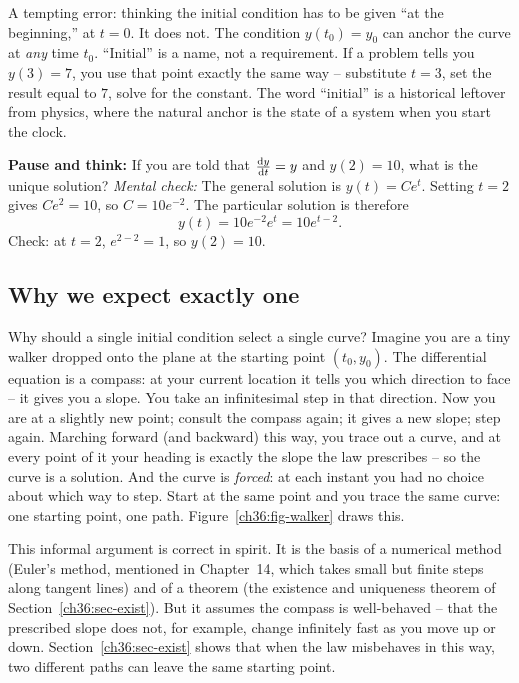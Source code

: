 \begin{trapbox}
A tempting error: thinking the initial condition has to be given ``at the beginning,'' at $t=0$. It does not. The condition $y(t_0)=y_0$ can anchor the curve at \emph{any} time $t_0$. ``Initial'' is a name, not a requirement. If a problem tells you $y(3) = 7$, you use that point exactly the same way -- substitute $t=3$, set the result equal to $7$, solve for the constant. The word ``initial'' is a historical leftover from physics, where the natural anchor is the state of a system when you start the clock.
\end{trapbox}

\begin{recoverybox}
\textbf{Pause and think:} If you are told that $\frac{\mathrm{d} y}{\mathrm{d} t} = y$ and $y(2) = 10$, what is the unique solution?
\emph{Mental check:} The general solution is $y(t) = Ce^t$. Setting $t=2$ gives $Ce^2 = 10$, so $C = 10e^{-2}$. The particular solution is therefore
\[
  y(t) = 10e^{-2}e^t = 10e^{t-2}.
\]
Check: at $t=2$, $e^{2-2} = 1$, so $y(2) = 10$.
\end{recoverybox}

\subsection{Why we expect exactly one}

Why should a single initial condition select a single curve? Imagine you are a tiny walker dropped onto the plane at the starting point $(t_0, y_0)$. The differential equation is a compass: at your current location it tells you which direction to face -- it gives you a slope. You take an infinitesimal step in that direction. Now you are at a slightly new point; consult the compass again; it gives a new slope; step again. Marching forward (and backward) this way, you trace out a curve, and at every point of it your heading is exactly the slope the law prescribes -- so the curve is a solution. And the curve is \emph{forced}: at each instant you had no choice about which way to step. Start at the same point and you trace the same curve: one starting point, one path. Figure~\ref{ch36:fig-walker} draws this.

This informal argument is correct in spirit. It is the basis of a numerical method (Euler's method, mentioned in Chapter~14, which takes small but finite steps along tangent lines) and of a theorem (the existence and uniqueness theorem of Section~\ref{ch36:sec-exist}). But it assumes the compass is well-behaved -- that the prescribed slope does not, for example, change infinitely fast as you move up or down. Section~\ref{ch36:sec-exist} shows that when the law misbehaves in this way, two different paths can leave the same starting point.

